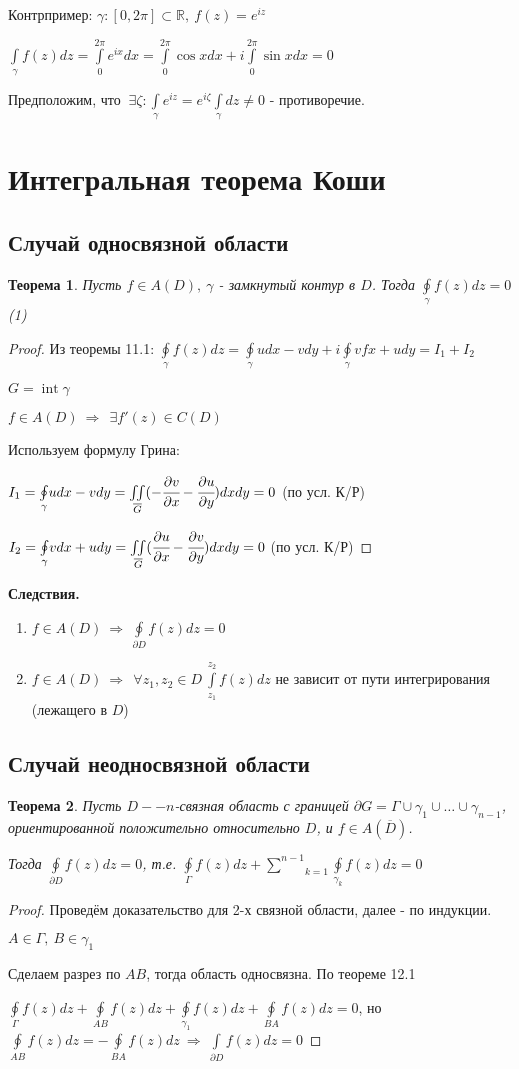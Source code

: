 \documentclass[draft]{report}
\newcommand{\dd}{\partial}
\newcommand{\then}{\ \Rightarrow\ }
\newcommand{\R}{\mathbb{R}}
\newcommand{\mint}[2]{\underset{#1}{\overset{#2}{\int}}}
\newcommand{\moint}[1]{\underset{#1}{\oint}}
\newcommand{\msum}[2]{\underset{#1}{\overset{#2}{\sum}}}
\renewcommand{\bar}{\overline}
\newcommand{\Int}{\mathop{\mathrm{int}}\nolimits}
\newcommand{\g}{\gamma}
\newcommand{\G}{\Gamma}
\newcommand{\E}{\ \exists}
\newcommand{\F}{\ \forall}
\newtheorem*{theor}{Теорема}
\theoremstyle{remark}
\begin{document}
Контрпример: $\g\colon[0,2\pi]\subset\R,\ f(z)=e^{iz}$

$\mint{\g}{}f(z)dz=\mint{0}{2\pi}e^{ix}dx=\mint{0}{2\pi}\cos xdx+i\mint{0}{2\pi}\sin xdx=0$

Предположим, что $\E\zeta\colon\mint{\g}{}e^{iz}=e^{i\zeta}\mint{\g}{}dz\neq0$ - противоречие.

\section{Интегральная теорема Коши}

\subsection{Случай односвязной области}

\begin{theor}
Пусть $f\in A(D),\ \g$ - замкнутый контур в $D$. Тогда $\moint\g f(z)dz=0$ (1)
\end{theor}
\begin{proof}
Из теоремы 11.1: $\moint\g f(z)dz=\moint\g udx-vdy+i\moint\g vfx+udy=I_1+I_2$

$G=\Int \g$

$f\in A(D)\then \E f'(z)\in C(D)$

Используем формулу Грина:

$I_1=\moint\g udx-vdy=\underset{\bar{G}}{\iint}(-\cfrac{\dd v}{\dd x}-\cfrac{\dd u}{\dd y})dxdy=0$ (по усл. К/Р)

$I_2=\moint\g vdx+udy=\underset{\bar{G}}{\iint}(\cfrac{\dd u}{\dd x}-\cfrac{\dd v}{\dd y})dxdy=0$ (по усл. К/Р)
\end{proof}

{\bfseries Следствия.}
\begin{enumerate}
\item $f\in A(D)\then\moint{\dd D}f(z)dz=0$
\item $f\in A(D)\then\F z_1,z_2\in D\  \mint{z_1}{z_2}f(z)dz$ не зависит от пути интегрирования (лежащего в $D$)
\end{enumerate}

\subsection{Случай неодносвязной области}

\begin{theor}
Пусть $D--n$-связная область с границей $\dd G=\G\cup\g_1\cup\ldots\cup\g_{n-1}$, ориентированной положительно относительно $D$, и $f\in A(\bar{D})$. 

Тогда $\moint{\dd D}f(z)dz=0$, т.е. $\moint{\G}f(z)dz+\msum{k=1}{n-1}\moint{\g_k}f(z)dz=0$
\end{theor}
\begin{proof}
Проведём доказательство для 2-х связной области, далее - по индукции.

$A\in\G,\ B\in\g_1$

Сделаем разрез по $AB$, тогда область односвязна. По теореме 12.1

$\moint{\G}f(z)dz+\moint{AB}f(z)dz+\moint{\g_1}f(z)dz+\moint{BA}f(z)dz=0$, но $\moint{AB}f(z)dz=-\moint{BA}f(z)dz\then\mint{\dd D}{}f(z)dz=0$
\end{proof}
\end{document}

